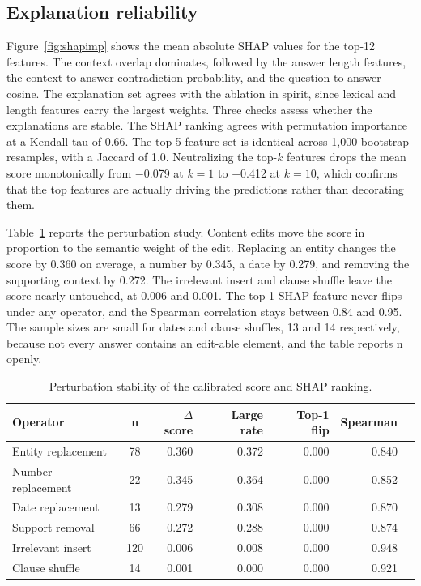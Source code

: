 \subsection{Explanation reliability}

Figure~\ref{fig:shapimp} shows the mean absolute SHAP values for the top-12 features. The context overlap dominates, followed by the answer length features, the context-to-answer contradiction probability, and the question-to-answer cosine. The explanation set agrees with the ablation in spirit, since lexical and length features carry the largest weights. Three checks assess whether the explanations are stable. The SHAP ranking agrees with permutation importance at a Kendall tau of 0.66. The top-5 feature set is identical across 1{,}000 bootstrap resamples, with a Jaccard of 1.0. Neutralizing the top-$k$ features drops the mean score monotonically from $-$0.079 at $k=1$ to $-$0.412 at $k=10$, which confirms that the top features are actually driving the predictions rather than decorating them.

Table~\ref{tab:perturb} reports the perturbation study. Content edits move the score in proportion to the semantic weight of the edit. Replacing an entity changes the score by 0.360 on average, a number by 0.345, a date by 0.279, and removing the supporting context by 0.272. The irrelevant insert and clause shuffle leave the score nearly untouched, at 0.006 and 0.001. The top-1 SHAP feature never flips under any operator, and the Spearman correlation stays between 0.84 and 0.95. The sample sizes are small for dates and clause shuffles, 13 and 14 respectively, because not every answer contains an edit-able element, and the table reports n openly.

\begin{table}[t]
\centering
\small
\caption{Perturbation stability of the calibrated score and SHAP ranking.}
\label{tab:perturb}
\begin{tabular}{@{}lcrrrrr@{}}
\toprule
\textbf{Operator} & \textbf{n} & \textbf{$\Delta$score} & \textbf{Large rate} & \textbf{Top-1 flip} & \textbf{Spearman} \\
\midrule
Entity replacement    & 78  & 0.360 & 0.372 & 0.000 & 0.840 \\
Number replacement    & 22  & 0.345 & 0.364 & 0.000 & 0.852 \\
Date replacement      & 13  & 0.279 & 0.308 & 0.000 & 0.870 \\
Support removal       & 66  & 0.272 & 0.288 & 0.000 & 0.874 \\
Irrelevant insert     & 120 & 0.006 & 0.008 & 0.000 & 0.948 \\
Clause shuffle        & 14  & 0.001 & 0.000 & 0.000 & 0.921 \\
\bottomrule
\end{tabular}
\end{table}

